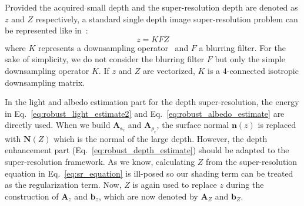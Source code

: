 Provided the acquired small depth and the super-resolution depth are denoted as $z$ and $Z$ respectively,
a standard single depth image super-resolution problem can be represented like in~\cite{yang2010image}:
\begin{equation}\label{eq:sr_equation}
z = KFZ
\end{equation}
where $K$ represents a downsampling operator~\cite{unger2010convex} and $F$ a blurring filter.
For the sake of simplicity, we do not consider the blurring filter $F$ but only the simple downsampling operator $K$.
If $z$ and $Z$ are vectorized, $K$ is a 4-connected isotropic downsampling matrix.

In the light and albedo estimation part for the depth super-resolution, the energy in Eq.~\ref{eq:robust_light_estimate2} and Eq.~\ref{eq:robust_albedo_estimate} are directly used. When we build $\mathbf{A}_{\mathbf{s}_c}$ and $\mathbf{A}_{\rho_c}$, the surface normal $\mathbf{n}(z)$ is replaced with $\mathbf{N}(Z)$ which is the normal of the large depth. 
However, the depth enhancement part (Eq.~\ref{eq:robust_depth_estimate}) should be adapted to the super-resolution framework. 
As we know, calculating $Z$ from the super-resolution equation in Eq.~\ref{eq:sr_equation} is ill-posed so our shading term can be treated as the regularization term.
Now, $Z$ is again used to replace $z$ during the construction of $\mathbf{A}_z$ and $\mathbf{b}_z$, which are now denoted by $\mathbf{A}_Z$ and $\mathbf{b}_Z$.
 
